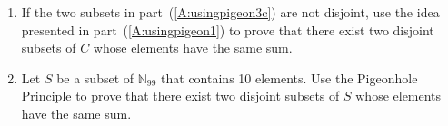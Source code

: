 \begin{enumerate}
\begin{enumerate}
\item If the two subsets in part~(\ref{A:usingpigeon3c}) are not disjoint, use the idea presented in part~(\ref{A:usingpigeon1}) to prove that there exist two disjoint subsets of $C$ whose elements have the same sum.


\item Let $S$ be a subset of $\mathbb{N}_{99}$ that contains 10 elements.  Use the Pigeonhole Principle to prove that there exist two disjoint subsets of $S$ whose elements have the same sum.
\label{exer:sec92-pigeon2}%
\end{enumerate}

\end{enumerate}


\hbreak

\endinput
